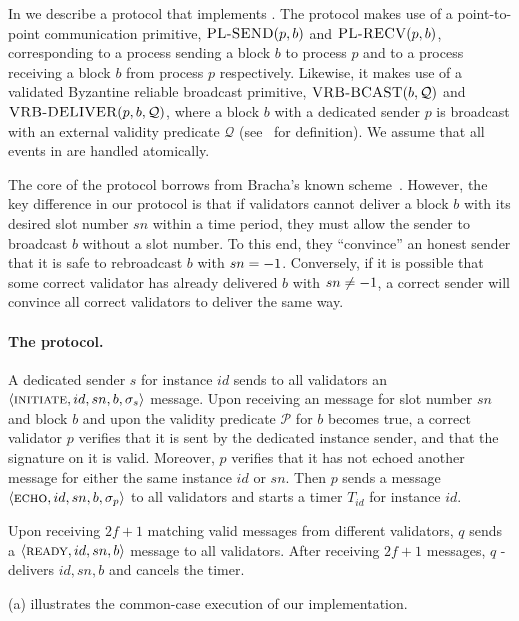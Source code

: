 In  we describe a protocol that implements \primitive.
The protocol makes use of a point-to-point communication primitive, $\textsc{PL-SEND}(p,b)$ and $\textsc{PL-RECV}(p,b)$,
corresponding to a process sending a block $b$ to process $p$ and to a process receiving a block $b$ from process $p$ respectively.
Likewise, it makes use of a validated Byzantine reliable broadcast primitive,
$\textsc{VRB-BCAST}(b,\mathcal{Q})$ and $\textsc{VRB-DELIVER}(p,b,\mathcal{Q})$, where
a block $b$ with a dedicated sender $p$ is broadcast with an external validity predicate $\mathcal{Q}$ (see~\cite{CachinKPS01} for definition).
We assume that all events in  are handled atomically.

The core of the \primitive protocol borrows from Bracha's known scheme~\cite{BrachaT85}.
However, the key difference in our protocol is that if validators cannot deliver a block $b$ with its desired slot number $sn$ within a time period, they must 
allow the sender to broadcast $b$ without a slot number.
To this end, they ``convince'' an honest sender that it is safe to rebroadcast $b$ with $sn=-1$.
Conversely,
if it is possible that some correct validator has already delivered $b$ with $sn\neq-1$, a correct sender will convince all correct validators to deliver the same way.

\paragraph{The protocol.}
A dedicated \primitive sender $s$ for instance $id$ sends to all validators an $\langle\textsc{initiate}, id, sn, b, \sigma_s\rangle$ message.
Upon receiving an \initiate message for slot number $sn$ and block $b$ and upon the validity predicate $\mathcal{P}$ for $b$ becomes true, a correct validator $p$ verifies that it is sent by the dedicated instance sender, and that the signature on it is valid.
Moreover, $p$ verifies that it has not echoed another message for either the same instance $id$ or $sn$.
Then $p$ sends a message $\langle\textsc{echo}, id, sn, b, \sigma_p\rangle$ to all validators and starts a timer $T_{\mathit{id}}$ for instance $id$.

Upon receiving $2f+1$ matching valid \echo messages from different validators, $q$ sends a $\langle\textsc{ready}, id, sn, b\rangle$ message to all validators.
After receiving $2f+1$ \ready messages,
$q$ \primitivesmall-delivers $id,sn,b$ and cancels the timer.

(a) illustrates the common-case execution of our \primitive implementation.

